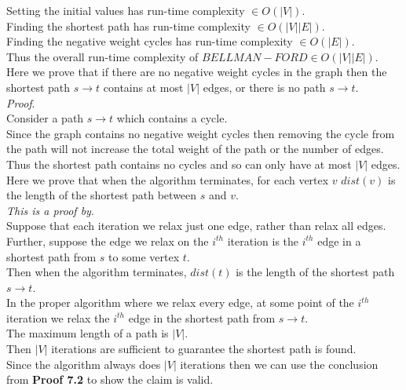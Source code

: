 \documentclass[11pt,a4paper]{article}
\begin{document}
Setting the initial values has run-time complexity  $\in O(|V|)$.\\
Finding the shortest path has run-time complexity $\in O(|V||E|)$.\\
Finding the negative weight cycles has run-time complexity $\in O(|E|)$.\\
Thus the overall run-time complexity of $BELLMAN-FORD\in O(|V||E|)$.\\

\newpage
{}
Here we prove that if there are no negative weight cycles in the graph then the shortest path $s\to t$ contains at most $|V|$ edges, or there is no path $s\to t$.\\
\textit{Proof}.\\
Consider a path $s\to t$ which contains a cycle.\\
Since the graph contains no negative weight cycles then removing the cycle from the path will not increase the total weight of the path or the number of edges.\\
Thus the shortest path contains no cycles and so can only have at most $|V|$ edges.\\

Here we prove that when the algorithm terminates, for each vertex $v$ $dist(v)$ is the length of the shortest path between $s$ and $v$.\\
\textit{This is a proof by}.\\
Suppose that each iteration we relax just one edge, rather than relax all edges.\\
Further, suppose the edge we relax on the $i^{th}$ iteration is the $i^{th}$ edge in a shortest path from $s$ to some vertex $t$.\\
Then when the algorithm terminates, $dist(t)$ is the length of the shortest path $s\to t$.\\
In the proper algorithm where we relax every edge, at some point of the $i^{th}$ iteration we relax the $i^{th}$ edge in the shortest path from $s\to t$.\\
The maximum length of a path is $|V|$.\\
Then $|V|$ iterations are sufficient to guarantee the shortest path is found.\\
Since the algorithm always does $|V|$ iterations then we can use the conclusion from \textbf{Proof 7.2} to show the claim is valid.\\
\end{document}
